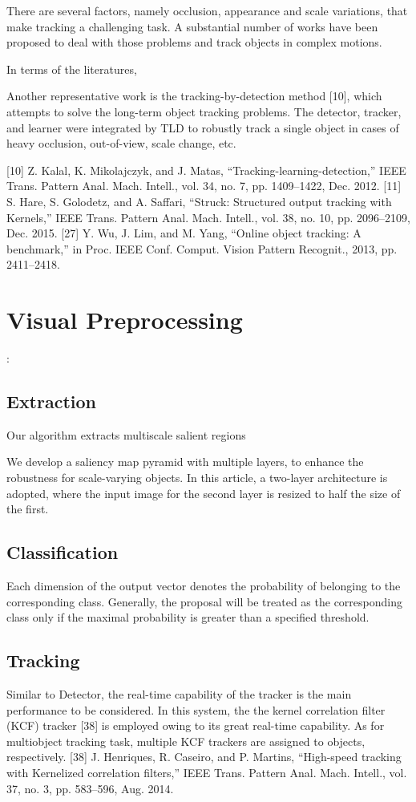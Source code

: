 \documentclass[a4paper]{report}
\begin{document}
There are several factors, namely occlusion, appearance and scale variations, that make tracking a challenging task. A substantial number of works have been proposed to deal with those problems and track objects in complex motions.


In terms of the literatures,

Another representative work is the tracking-by-detection method [10], which attempts to solve the long-term object tracking problems.
The detector, tracker, and learner were integrated by TLD to robustly track a single object in cases of heavy occlusion, out-of-view, scale change, etc. 


[10] Z. Kalal, K. Mikolajczyk, and J. Matas, “Tracking-learning-detection,”
IEEE Trans. Pattern Anal. Mach. Intell., vol. 34, no. 7, pp. 1409–1422,
Dec. 2012.
[11] S. Hare, S. Golodetz, and A. Saffari, “Struck: Structured output tracking
with Kernels,” IEEE Trans. Pattern Anal. Mach. Intell., vol. 38, no. 10,
pp. 2096–2109, Dec. 2015.
[27] Y. Wu, J. Lim, and M. Yang, “Online object tracking: A benchmark,” in
Proc. IEEE Conf. Comput. Vision Pattern Recognit., 2013, pp. 2411–2418.


\section{Visual Preprocessing}:
\subsection{Extraction}
Our algorithm extracts multiscale salient regions

We develop a saliency map pyramid with multiple layers, to enhance the robustness for
scale-varying objects. In this article, a two-layer architecture is adopted, where the input image for the second layer is resized to half the size of the first.

\subsection{Classification}
Each dimension of the output vector denotes the probability of
belonging to the corresponding class. Generally, the proposal
will be treated as the corresponding class only if the maximal
probability is greater than a specified threshold.

\subsection{Tracking}
Similar to Detector, the real-time capability of the tracker is
the main performance to be considered. In this system, the the
kernel correlation filter (KCF) tracker [38] is employed owing
to its great real-time capability. As for multiobject tracking task,
multiple KCF trackers are assigned to objects, respectively.
[38] J. Henriques, R. Caseiro, and P. Martins, “High-speed tracking with
Kernelized correlation filters,” IEEE Trans. Pattern Anal. Mach. Intell.,
vol. 37, no. 3, pp. 583–596, Aug. 2014.
\end{document}

